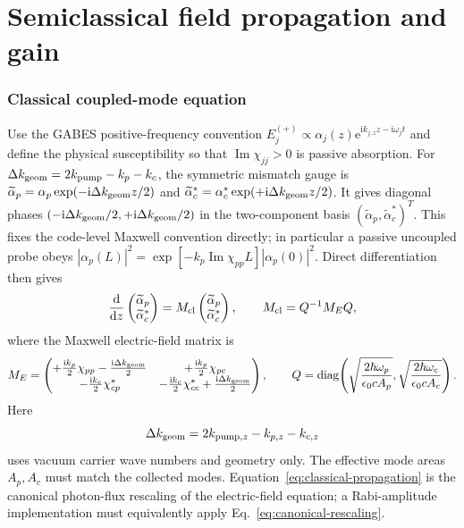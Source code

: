 \documentclass[11pt,a4paper]{article}
\newcommand{\dd}{\mathrm d}
\newcommand{\ii}{\mathrm i}
\newcommand{\e}{\mathrm e}
\newcommand{\Ima}{\operatorname{Im}}
\begin{document}
\part{Semiclassical field propagation and gain}

\section{Classical coupled-mode equation}

Use the GABES positive-frequency convention
$E_j^{(+)}\propto\alpha_j(z)\e^{\ii k_{j,z}z-\ii\omega_jt}$ and define the
physical susceptibility so that $\Ima\chi_{jj}>0$ is passive absorption.
For $\Delta k_{\rm geom}=2k_{\rm pump}-k_p-k_c$, the symmetric mismatch
gauge is
$\widetilde\alpha_p=\alpha_p\exp(-\ii\Delta k_{\rm geom}z/2)$ and
$\widetilde\alpha_c^*=\alpha_c^*\exp(+\ii\Delta k_{\rm geom}z/2)$.
It gives diagonal phases $(-\ii\Delta k_{\rm geom}/2,
+\ii\Delta k_{\rm geom}/2)$ in the two-component basis
$(\widetilde\alpha_p,\widetilde\alpha_c^*)^T$. This fixes the code-level
Maxwell convention directly; in particular a passive uncoupled probe obeys
$|\alpha_p(L)|^2=\exp[-k_p\Ima\chi_{pp}L]|\alpha_p(0)|^2$.
Direct differentiation then gives
\begin{equation}
\frac{\dd}{\dd z}
\begin{pmatrix}\widetilde\alpha_p\\\widetilde\alpha_c^*\end{pmatrix}
=M_{\rm cl}
\begin{pmatrix}\widetilde\alpha_p\\\widetilde\alpha_c^*\end{pmatrix},
\qquad
M_{\rm cl}=Q^{-1}M_EQ,
\label{eq:classical-propagation}
\end{equation}
where the Maxwell electric-field matrix is
\begin{equation}
M_E=
\begin{pmatrix}
+\frac{\ii k_p}{2}\chi_{pp}-\frac{\ii\Delta k_{\rm geom}}2 &
+\frac{\ii k_p}{2}\chi_{pc}\\
-\frac{\ii k_c}{2}\chi_{cp}^* &
-\frac{\ii k_c}{2}\chi_{cc}^*+\frac{\ii\Delta k_{\rm geom}}2
\end{pmatrix},\qquad
Q=\operatorname{diag}\!\left(
\sqrt{\frac{2\hbar\omega_p}{\epsilon_0cA_p}},
\sqrt{\frac{2\hbar\omega_c}{\epsilon_0cA_c}}\right).
\label{eq:electric-propagation}
\end{equation}
Here
\begin{equation}
\Delta k_{\rm geom}=2k_{{\rm pump},z}-k_{p,z}-k_{c,z}
\label{eq:geometric-mismatch}
\end{equation}
uses vacuum carrier wave numbers and geometry only.
The effective mode areas $A_p,A_c$ must match the collected modes.
Equation~\eqref{eq:classical-propagation} is the canonical photon-flux
rescaling of the electric-field equation; a Rabi-amplitude implementation
must equivalently apply Eq.~\eqref{eq:canonical-rescaling}.
\end{document}
